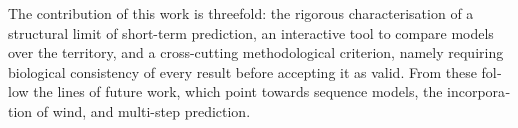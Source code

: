 \begin{otherlanguage}{english}
  The contribution of this work is threefold: the rigorous characterisation of a
  structural limit of short-term prediction, an interactive tool to compare models
  over the territory, and a cross-cutting methodological criterion, namely requiring
  biological consistency of every result before accepting it as valid. From these
  follow the lines of future work, which point towards sequence models, the
  incorporation of wind, and multi-step prediction.
\end{otherlanguage}


